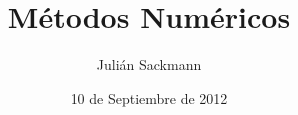 \documentclass[]{article}
\title{Métodos Numéricos}
\author{ Julián Sackmann }
\date{10 de Septiembre de 2012}
\begin{document}
\ifpdf
{}
\else
{}
\fi

\setcounter{tocdepth}{4}

\newcommand{\ig}[2]{
\begin{center}
	\texttt{[image: \#2]}
\end{center}}
\newcommand{\subsubsubsection}[1]{\paragraph{#1}~\newline
 \indent }
\newcommand{\subsubsubsubsection}[1]{\subparagraph{#1}}
\newcommand{\flecha}[1]{\xrightarrow[\hspace*{0.3cm} #1 \hspace*{0.3cm}]{}}
\newcommand{\Flecha}[1]{\xRightarrow[\hspace*{0.3cm} #1 \hspace*{0.3cm}]{}}
\newcommand{\caja}[2]{\begin{center}
	\fbox{
		\parbox{#1\linewidth}{
			#2
		}
	}
\end{center}}
\renewcommand\contentsname{Índice}

\newcommand{\pti}[2]{\forall i \in [#1,\cdots,#2]\ /\ }
\newcommand{\integral}[4]{\int_{#1}^{#2} \! #3 \, \mathrm{d}#4}

\newcommand{\rojo}[1]{\mathbin{\color{red}{#1}}}
\newcommand{\verde}[1]{\mathbin{\color{green}{#1}}}
\newcommand{\azul}[1]{\mathbin{\color{blue}{#1}}}
\newcommand{\dl}[2]{\substack{\text{#1} \\ \text{#2}}}


\newtheorem{teo}{Teorema}
\newtheorem{defi}[teo]{Definición}
\newtheorem{lem}[teo]{Lema}
\newtheorem{prop}[teo]{Proposición}
\newtheorem{cor}[teo]{Corolario}
\newtheorem{obs}[teo]{Observación}
\renewcommand*{\proofname}{Demostración}

\def\N{\mathbb{N}}
\def\R{\mathbb{R}}
\def\Z{\mathbb{Z}}
\def\Q{\mathbb{Q}}
\def\e{\varepsilon}
\def\d{\delta}
\def\eq{=}

\def\x{\times}
\newcommand{\tab}[0]{\hspace{2cm}}
\newcommand{\rn}[2]{\in\R^{#1\x #2}}
\renewcommand{\dfrac}[2]{\displaystyle \frac{#1}{#2}}
\newcommand{\partir}[4]{
\begin{minipage}[b]{#1\linewidth}\centering\begin{center}#3\end{center}\end{minipage}\begin{minipage}[b]{#2\linewidth}\centering\begin{center}#4\end{center}\end{minipage}
}
\end{document}
